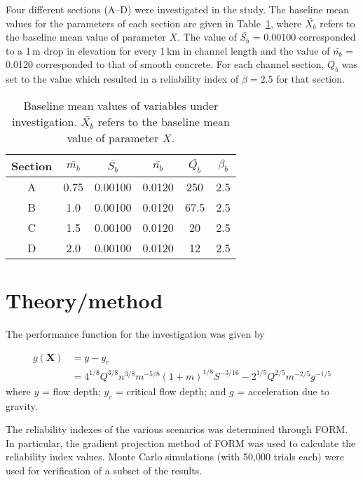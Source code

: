\documentclass[a4paper]{article}
\begin{document}
Four different sections (A--D) were investigated in the study. The baseline
mean values for the parameters of each section are given in Table~\ref{tab:x_b},
where $\bar{X_b}$ refers to the baseline mean value of parameter $X$.
The value of $\bar{S_b}$ = 0.00100 corresponded to a 1\,m drop in elevation for every 1\,km
in channel length and the value of $\bar{n_b}$ = 0.0120 corresponded to that of smooth concrete.
For each channel section, $\bar{Q_b}$ was set to the value which resulted in a reliability index of 
$\beta=2.5$ for that section.

\begin{table}[htbp]
\centering
\begin{tabular}{cccccc} \toprule
Section & \multicolumn{1}{c}{$\bar{m_b}$} & \multicolumn{1}{c}{$\bar{S_b}$} & \multicolumn{1}{c}{$\bar{n_b}$} & \multicolumn{1}{c}{$\bar{Q_b}$} & \multicolumn{1}{c}{$\beta_b$} \\ \midrule
A & 0.75 & 0.00100 & 0.0120 & 250 & 2.5 \\ 
B & 1.0 & 0.00100 & 0.0120 & 67.5 & 2.5 \\ 
C & 1.5 & 0.00100 & 0.0120 & 20 & 2.5 \\ 
D & 2.0 & 0.00100 & 0.0120 & 12 & 2.5 \\ \bottomrule
\end{tabular}
\caption{Baseline mean values of variables under investigation. 
         $\bar{X_b}$ refers to the baseline mean value of parameter $X$.}
\label{tab:x_b}
\end{table}



\newpage
\section{Theory/method}
The performance function for the investigation was given by

\begin{align*}
g(\mathbf{X}) &= y - y_c \\
              &= 4^{1/8}Q^{3/8}n^{3/8}m^{-5/8}(1+m)^{1/8}S^{-3/16} - 2^{1/5}Q^{2/5}m^{-2/5}g^{-1/5}
\end{align*}
where $y$ = flow depth; $y_c$ = critical flow depth; and $g$ = acceleration due to gravity.

The reliability indexes of the various scenarios was determined through FORM.
In particular, the gradient projection method of FORM was used to calculate the 
reliability index values.
Monte Carlo simulations (with 50,000 trials each) 
were used for verification of a subset of the results.
\end{document}
